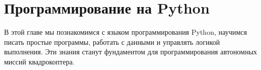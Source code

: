 \section{Программирование на Python}
\label{sec:python_programming}

\begin{infobox}
В этой главе мы познакомимся с языком программирования Python, научимся писать простые программы, работать с данными и управлять логикой выполнения. Эти знания станут фундаментом для программирования автономных миссий квадрокоптера.
\end{infobox}
